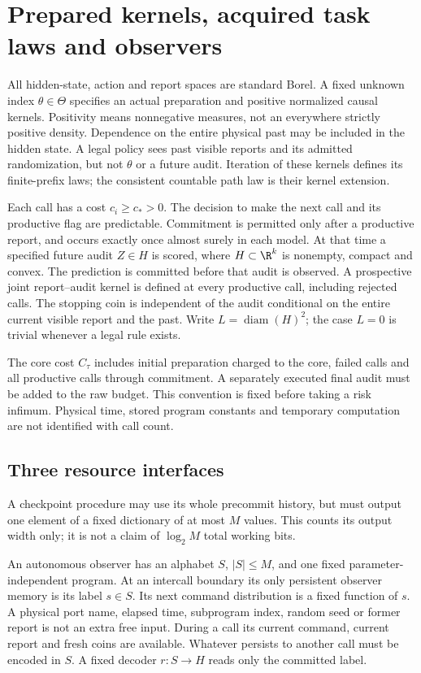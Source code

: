 \section{Prepared kernels, acquired task laws and observers}\label{sec:data}
All hidden-state, action and report spaces are standard Borel. A fixed unknown index $\theta\in\Theta$ specifies an actual preparation and positive normalized causal kernels. Positivity means nonnegative measures, not an everywhere strictly positive density. Dependence on the entire physical past may be included in the hidden state. A legal policy sees past visible reports and its admitted randomization, but not $\theta$ or a future audit. Iteration of these kernels defines its finite-prefix laws; the consistent countable path law is their kernel extension.

Each call has a cost $c_i\ge c_*>0$. The decision to make the next call and its productive flag are predictable. Commitment is permitted only after a productive report, and occurs exactly once almost surely in each model. At that time a specified future audit $Z\in H$ is scored, where $H\subset\R^k$ is nonempty, compact and convex. The prediction is committed before that audit is observed. A prospective joint report--audit kernel is defined at every productive call, including rejected calls. The stopping coin is independent of the audit conditional on the entire current visible report and the past. Write $L=\operatorname{diam}(H)^2$; the case $L=0$ is trivial whenever a legal rule exists.

The core cost $C_\tau$ includes initial preparation charged to the core, failed calls and all productive calls through commitment. A separately executed final audit must be added to the raw budget. This convention is fixed before taking a risk infimum. Physical time, stored program constants and temporary computation are not identified with call count.

\subsection*{Three resource interfaces}
A checkpoint procedure may use its whole precommit history, but must output one element of a fixed dictionary of at most $M$ values. This counts its output width only; it is not a claim of $\log_2 M$ total working bits.

An autonomous observer has an alphabet $S$, $|S|\le M$, and one fixed parameter-independent program. At an intercall boundary its only persistent observer memory is its label $s\in S$. Its next command distribution is a fixed function of $s$. A physical port name, elapsed time, subprogram index, random seed or former report is not an extra free input. During a call its current command, current report and fresh coins are available. Whatever persists to another call must be encoded in $S$. A fixed decoder $r:S\to H$ reads only the committed label.

